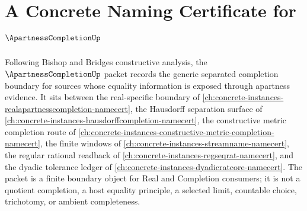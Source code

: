 \chapter{A Concrete Naming Certificate for $\ApartnessCompletionUp$}
\label{ch:concrete-instances-apartness-completion-namecert}

Following Bishop and Bridges constructive analysis, the $\ApartnessCompletionUp$ packet records the generic separated completion boundary for sources whose equality information is exposed through apartness evidence. It sits between the real-specific boundary of \autoref{ch:concrete-instances-realapartnesscompletion-namecert}, the Hausdorff separation surface of \autoref{ch:concrete-instances-hausdorffcompletion-namecert}, the constructive metric completion route of \autoref{ch:concrete-instances-constructive-metric-completion-namecert}, the finite windows of \autoref{ch:concrete-instances-streamname-namecert}, the regular rational readback of \autoref{ch:concrete-instances-regseqrat-namecert}, and the dyadic tolerance ledger of \autoref{ch:concrete-instances-dyadicratcore-namecert}. The packet is a finite boundary object for Real and Completion consumers; it is not a quotient completion, a host equality principle, a selected limit, countable choice, trichotomy, or ambient completeness.

